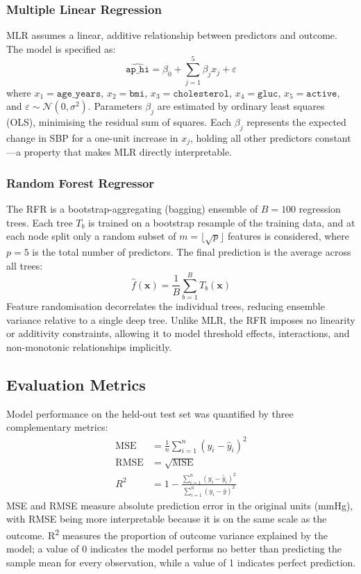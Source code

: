 ﻿\documentclass[conference]{IEEEtran}
\begin{document}
\subsubsection{Multiple Linear Regression}
MLR assumes a linear, additive relationship between predictors and outcome. The model is specified as:
\begin{equation}
  \widehat{\texttt{ap\_hi}} = \beta_0 + \sum_{j=1}^{5} \beta_j x_j + \varepsilon
  \label{eq:mlr}
\end{equation}
where $x_1=\texttt{age\_years}$, $x_2=\texttt{bmi}$, $x_3=\texttt{cholesterol}$, $x_4=\texttt{gluc}$, $x_5=\texttt{active}$, and $\varepsilon \sim \mathcal{N}(0,\sigma^2)$. Parameters $\beta_j$ are estimated by ordinary least squares (OLS), minimising the residual sum of squares. Each $\beta_j$ represents the expected change in SBP for a one-unit increase in $x_j$, holding all other predictors constant---a property that makes MLR directly interpretable.

\subsubsection{Random Forest Regressor}
The RFR is a bootstrap-aggregating (bagging) ensemble of $B=100$ regression trees. Each tree $T_b$ is trained on a bootstrap resample of the training data, and at each node split only a random subset of $m = \lfloor\sqrt{p}\rfloor$ features is considered, where $p=5$ is the total number of predictors. The final prediction is the average across all trees:
\begin{equation}
  \hat{f}(\mathbf{x}) = \frac{1}{B}\sum_{b=1}^{B} T_b(\mathbf{x})
  \label{eq:rf}
\end{equation}
Feature randomisation decorrelates the individual trees, reducing ensemble variance relative to a single deep tree. Unlike MLR, the RFR imposes no linearity or additivity constraints, allowing it to model threshold effects, interactions, and non-monotonic relationships implicitly.

\subsection{Evaluation Metrics}

Model performance on the held-out test set was quantified by three complementary metrics:
\begin{align}
  \text{MSE}  &= \frac{1}{n}\sum_{i=1}^{n}(y_i - \hat{y}_i)^2 \label{eq:mse}\\
  \text{RMSE} &= \sqrt{\text{MSE}} \label{eq:rmse}\\
  R^2         &= 1 - \frac{\sum_{i=1}^{n}(y_i-\hat{y}_i)^2}{\sum_{i=1}^{n}(y_i-\bar{y})^2} \label{eq:r2}
\end{align}
MSE and RMSE measure absolute prediction error in the original units (mmHg), with RMSE being more interpretable because it is on the same scale as the outcome. R\textsuperscript{2} measures the proportion of outcome variance explained by the model; a value of 0 indicates the model performs no better than predicting the sample mean for every observation, while a value of 1 indicates perfect prediction.
\end{document}
